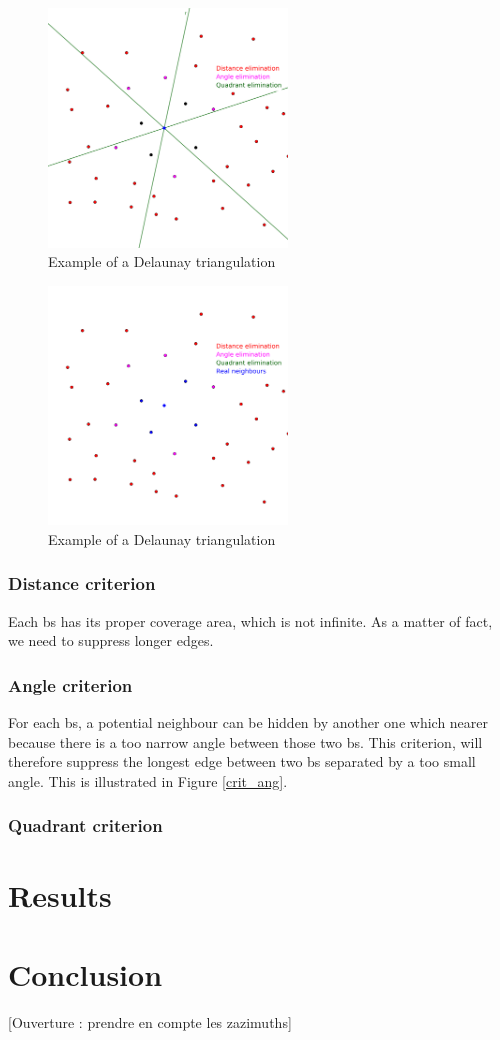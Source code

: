 \documentclass[lettersize,journal,english]{IEEEtran}
\begin{document}
\begin{figure}[!b]
    \centering
    \includegraphics[width=2.5in]{images/illus_crit/quadrant_elim.png}
    \caption{Example of a Delaunay triangulation}
    \label{crit_qua}
\end{figure}

\begin{figure}[!t]
    \centering
    \includegraphics[width=2.5in]{images/illus_crit/neighs.png}
    \caption{Example of a Delaunay triangulation}
    \label{crit_nei}
\end{figure}

\subsubsection{Distance criterion}
Each \acrshort{bs} has its proper coverage area, which is not infinite. As a matter of fact, we need to suppress longer edges.

\subsubsection{Angle criterion}
For each \acrshort{bs}, a potential neighbour can be \og hidden\fg{} by another one which nearer because there is a too narrow angle between those two \acrshort{bs}.
This criterion, will therefore suppress the longest edge between two \acrshort{bs} separated by a too small angle. This is illustrated in Figure \ref{crit_ang}.

\subsubsection{Quadrant criterion}

\section{Results}

\section{Conclusion}

[Ouverture : prendre en compte les zazimuths]

\printglossary[type=\acronymtype]
\printglossary



\end{document}
